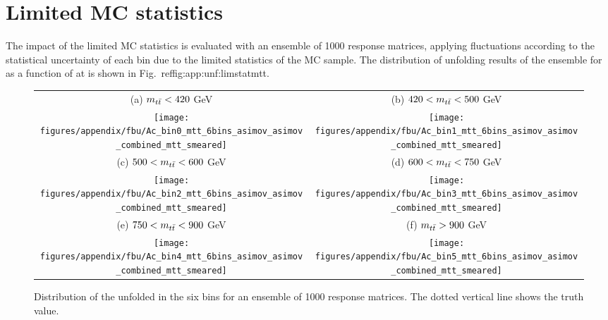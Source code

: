 \section{Limited MC statistics}
\label{app:unfolding:mcstat}

The impact of the limited MC statistics is evaluated with an
ensemble of 1000 response matrices, applying fluctuations according
to the statistical uncertainty of each bin due to the limited
statistics of the MC sample. The distribution of unfolding results of
the ensemble for
\ac{} as a function of \mtt{} at \eighttev{} is shown in
Fig.~ref{fig:app:unf:limstatmtt}. 

\begin{figure}[htbp]
\begin{center}
\begin{tabular}{cc}                                    
{(a)  $m_{t\bar{t}}{} < 420$ GeV} & {(b) $420 < m_{t\bar{t}}{} < 500$ GeV}  \\
 \texttt{[image: figures/appendix/fbu/Ac\_bin0\_mtt\_6bins\_asimov\_asimov\_combined\_mtt\_smeared]} &
 \texttt{[image: figures/appendix/fbu/Ac\_bin1\_mtt\_6bins\_asimov\_asimov\_combined\_mtt\_smeared]} \\
{(c) $500 < m_{t\bar{t}}{} < 600$ GeV} & {(d) $600 < m_{t\bar{t}}{} < 750$ GeV}  \\
 \texttt{[image: figures/appendix/fbu/Ac\_bin2\_mtt\_6bins\_asimov\_asimov\_combined\_mtt\_smeared]} &
 \texttt{[image: figures/appendix/fbu/Ac\_bin3\_mtt\_6bins\_asimov\_asimov\_combined\_mtt\_smeared]} \\
{(e) $750 < m_{t\bar{t}}{} < 900$ GeV} & {(f) $m_{t\bar{t}}{} > 900$ GeV}  \\
 \texttt{[image: figures/appendix/fbu/Ac\_bin4\_mtt\_6bins\_asimov\_asimov\_combined\_mtt\_smeared]} &
 \texttt{[image: figures/appendix/fbu/Ac\_bin5\_mtt\_6bins\_asimov\_asimov\_combined\_mtt\_smeared]} \\
\end{tabular}\caption{Distribution of the unfolded \ac{} in the six
  \mtt{} bins for an ensemble of 1000 response matrices. The dotted
  vertical line shows the truth \ac{} value.}
\label{fig:app:unf:limstatmtt}
\end{center}
\end{figure}
